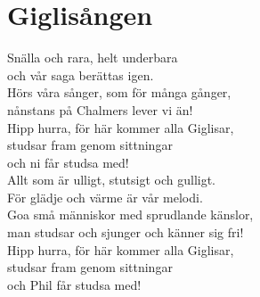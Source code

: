 \section{Giglisången}
Snälla och rara, helt underbara\\
och vår saga berättas igen.\\ 
Hörs våra sånger, som för många gånger,\\
nånstans på Chalmers lever vi än!\\

Hipp hurra, för här kommer alla Giglisar,\\
studsar fram genom sittningar\\
och ni får studsa med!\\

Allt som är ulligt, stutsigt och gulligt.\\
För glädje och värme är vår melodi.\\
Goa små människor med sprudlande känslor,\\
man studsar och sjunger och känner sig fri!\\

Hipp hurra, för här kommer alla Giglisar,\\
studsar fram genom sittningar\\
och Phil får studsa med!\\

